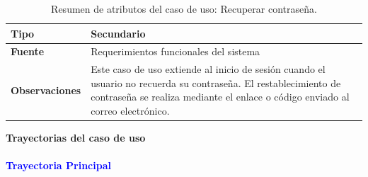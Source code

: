 \begin{table}[H]
\begin{tabular}{|l|p{10cm}|}
\textbf{Tipo} & Secundario \\ \hline

\textbf{Fuente} & Requerimientos funcionales del sistema \\ \hline

\textbf{Observaciones} & 
Este caso de uso extiende al inicio de sesión cuando el usuario no recuerda su contraseña. El restablecimiento de contraseña se realiza mediante el enlace o código enviado al correo electrónico. \\ \hline

\end{tabular}
\caption{Resumen de atributos del caso de uso: Recuperar contraseña.}
\label{tab:cuG02RecuperarContrasena}
\end{table}


{\large {\textbf{Trayectorias del caso de uso}}}

\vspace{0.5em}
\paragraph{\textbf{\textcolor{blue}{Trayectoria Principal}}}

